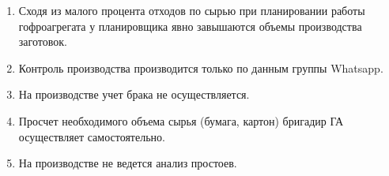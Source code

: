 \begin{enumerate}



\item Сходя из малого процента отходов по сырью при планировании работы гофроагрегата у планировщика явно завышаются объемы производства заготовок.

\item Контроль производства производится только по  данным группы Whatsapp. 

\item На производстве учет брака не осуществляется.

\item  Просчет необходимого объема сырья (бумага, картон) бригадир ГА осуществляет самостоятельно.








\item 	На производстве не ведется анализ простоев.



\end{enumerate}
